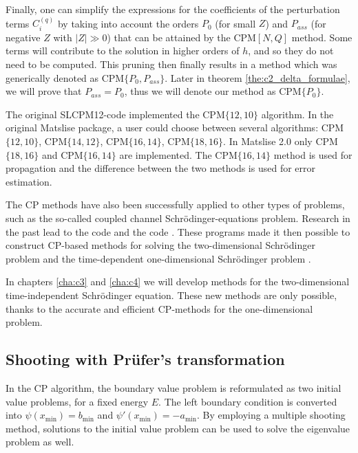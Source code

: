 Finally, one can simplify the expressions for the coefficients of the perturbation terms \(C^{(q)}_i\) by taking into account the orders $P_0$ (for small $Z$) and $P_{ass}$ (for negative $Z$ with $|Z| \gg 0$) that can be attained by the CPM$[N,Q]$ method. Some terms will contribute to the solution in higher orders of $h$, and so they do not need to be computed. This pruning then finally results in a method which was generically denoted as CPM$\{P_0, P_{ass}\}$. Later in theorem \ref{the:c2_delta_formulae}, we will prove that $P_{ass} = P_0$, thus we will denote our method as CPM$\{P_0\}$.

The original SLCPM12-code implemented the CPM$\{12,10\}$ algorithm. In the original Matslise package, a user could choose between several algorithms: CPM$\{12,10\}$, CPM$\{14,12\}$, CPM$\{16,14\}$, CPM$\{18,16\}$.
In Matslise 2.0 only CPM$\{18,16\}$ and CPM$\{16,14\}$ are implemented. The CPM$\{16,14\}$ method is used for propagation and the difference between the two methods is used for error estimation.

The CP methods have also been successfully applied to other types of problems, such as the so-called coupled channel Schrödinger-equations problem. Research in the past lead to the \fortran code \lilix \cite{ixaru_lilix_2002} and the \matlab code \matscs \cite{ledoux_numerical_2007}. These programs made it then possible to construct CP-based methods for solving the two-dimensional Schrödinger problem \cite{ixaru_new_2010} and the time-dependent one-dimensional Schrödinger problem \cite{ledoux_accurate_2014}.

In chapters \ref{cha:c3} and \ref{cha:c4} we will develop methods for the two-dimensional time-independent Schrödinger equation. These new methods are only possible, thanks to the accurate and efficient CP-methods for the one-dimensional problem.

\subsection{Shooting with Prüfer's transformation}\label{sec:c2_shooting_prufer}


In the CP algorithm, the boundary value problem is reformulated as two initial value problems, for a fixed
energy \(E\). The left boundary condition is converted into
\(\psi(x_\text{min}) = b_\text{min} \) and \(\psi'(x_\text{min}) = -a_\text{min}\). By
employing a multiple shooting method, solutions to the initial value
problem can be used to solve the eigenvalue problem as well.

